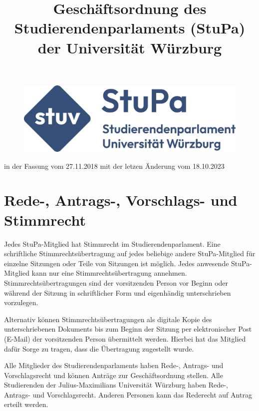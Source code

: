 \documentclass[10pt,a4paper]{scrartcl}
\title{\LARGE Geschäftsordnung des Studierendenparlaments (StuPa) der Universität Würzburg}
\date{}
\begin{document}
\maketitle

\begin{figure}[h]
	\includegraphics[width=\textwidth]{logo.eps}
\end{figure}


\vspace{4cm}

{\centering \Large \sffamily in der Fassung vom 27.11.2018 mit der letzen Änderung
vom 18.10.2023}

\pagebreak

\setcounter{tocdepth}{4}
\tableofcontents

\pagebreak


\section{Rede-, Antrags-, Vorschlags- und
Stimmrecht}\label{rede--antrags--vorschlags--und-stimmrecht}

\begin{contract}

\label{stimmrecht-und-stimmrechtsuebertragungen}

Jedes StuPa-Mitglied hat Stimmrecht im Studierendenparlament. Eine
schriftliche Stimmrechtsübertragung auf jedes beliebige andere
StuPa-Mitglied für einzelne Sitzungen oder Teile von Sitzungen ist
möglich. Jedes anwesende StuPa-Mitglied kann nur eine
Stimmrechtsübertragung annehmen. Stimmrechtsübertragungen sind der
vorsitzenden Person vor Beginn oder während der Sitzung in schriftlicher
Form und eigenhändig unterschrieben vorzulegen.

Alternativ können Stimmrechtsübertragungen als digitale Kopie des
unterschriebenen Dokuments bis zum Beginn der Sitzung per elektronischer Post
(E-Mail) der vorsitzenden Person übermittelt werden. Hierbei hat das Mitglied
dafür Sorge zu tragen, dass die Übertragung zugestellt wurde.


\label{rede--antrags--und-vorschlagsrecht}

Alle Mitglieder des Studierendenparlaments haben Rede-, Antrags- und
Vorschlagsrecht und können Anträge zur Geschäftsordnung stellen. Alle
Studierenden der Julius-Maximilians Universität Würzburg haben Rede-,
Antrags- und Vorschlagsrecht. Anderen Personen kann das Rederecht auf
Antrag erteilt werden.

\end{contract}
\end{document}
